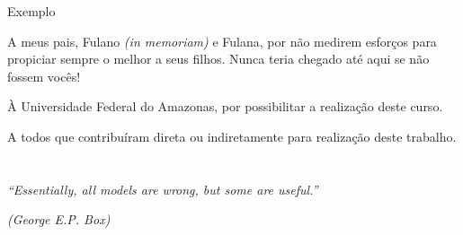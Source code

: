 \onehalfspacing

\thispagestyle{empty}

{\color{red} Exemplo}
 
 A meus pais, Fulano \textit{(in memoriam)} e Fulana, por não medirem esforços para propiciar sempre o melhor a seus filhos. Nunca teria chegado até aqui se não fossem vocês! 
 
 
 \vspace{0.3cm}
 
 
 
 
\vspace{0.3cm}
 À Universidade Federal do Amazonas, por possibilitar a realização deste curso.
 
 \vspace{0.3cm}
 A todos que contribuíram direta ou indiretamente para realização deste trabalho.
  
 
 \thispagestyle{empty}

\pagebreak




\chapter*{}
\thispagestyle{empty}

\vfill

\begin{flushright}
   \textit{``Essentially, all models are wrong, but some are useful.'' }\\
    \vspace{.2cm}
    
\textit{(George E.P. Box)}

\end{flushright}